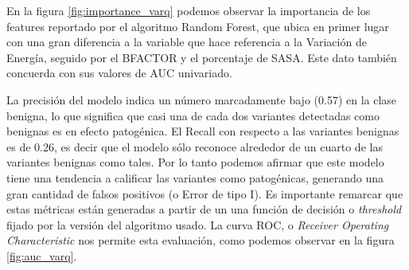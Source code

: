 En la figura \ref{fig:importance_varq} podemos observar la importancia de los features reportado por el algoritmo Random Forest, que ubica en primer lugar con una gran diferencia a la variable que hace referencia a la Variación de Energía, seguido por el BFACTOR y el porcentaje de SASA. Este dato también concuerda con sus valores de AUC univariado.

La precisión del modelo indica un número marcadamente bajo (0.57) en la clase benigna, lo que significa que casi una de cada dos variantes detectadas como benignas es en efecto patogénica. El Recall con respecto a las variantes benignas es de 0.26, es decir que el modelo sólo reconoce alrededor de un cuarto de las variantes benignas como tales. Por lo tanto podemos afirmar que este modelo tiene una tendencia a calificar las variantes como patogénicas, generando una gran cantidad de falsos positivos (o Error de tipo I). Es importante remarcar que estas métricas están generadas a partir de un una función de decisión o \textit{threshold} fijado por la versión del algoritmo usado. La curva ROC, o \textit{Receiver Operating Characteristic} nos permite esta evaluación, como podemos observar en la figura \ref{fig:auc_varq}.

\newpage

